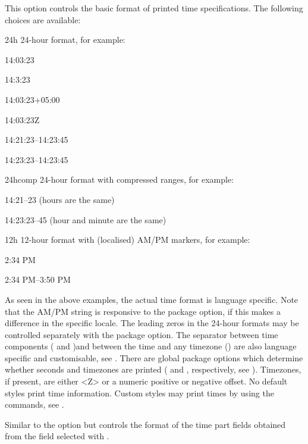 \documentclass{ltxdockit}[2011/03/25]
\begin{document}
\begin{optionlist}

This option controls the basic format of printed time specifications. The following choices are available:

\begin{valuelist}
\item[24h] 24-hour format, for example:\par
14:03:23\par
14:3:23\par
14:03:23+05:00\par
14:03:23Z\par
14:21:23--14:23:45\par
14:23:23--14:23:45\par
\item[24hcomp] 24-hour format with compressed ranges, for example:\par
14:21--23 (hours are the same)\par
14:23:23--45 (hour and minute are the same)\par
\item[12h] 12-hour format with (localised) AM/PM markers, for example:\par
2:34 PM\par
2:34 PM--3:50 PM\par
\end{valuelist}
%
As seen in the above examples, the actual time format is language specific. Note that the AM/PM string is responsive to the  package option, if this makes a difference in the specific locale. The leading zeros in the 24-hour formats may be controlled separately with the  package option. The separator between time components ( and )and between the time and any timezone () are also language specific and customisable, see . There are global package options which determine whether seconds and timezones are printed ( and , respectively, see ). Timezones, if present, are either <Z> or a numeric positive or negative offset. No default styles print time information. Custom styles may print times by using the  commands, see .


Similar to the  option but controls the format of the time part fields obtained from the field selected with .


\end{optionlist}
\end{document}

